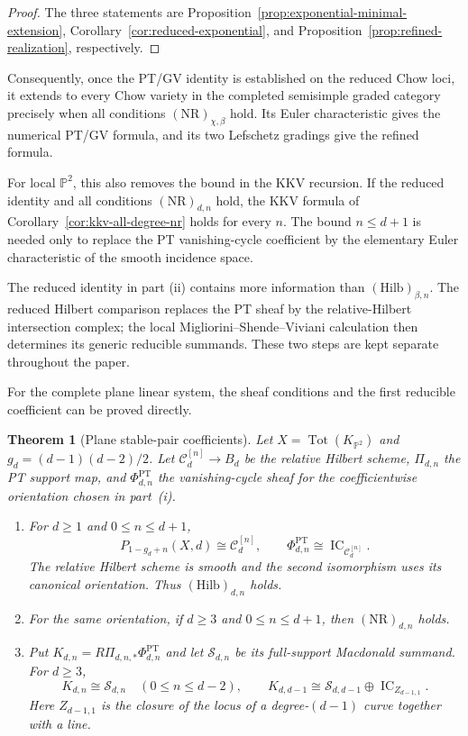 \documentclass[11pt,reqno]{amsart}
\newtheorem{theorem}{Theorem}[section]
\theoremstyle{definition}
\newcommand{\Pp}{\mathbb P}
\newcommand{\IC}{\operatorname{IC}}
\newcommand{\Tot}{\operatorname{Tot}}
\newcommand{\PT}{\operatorname{PT}}
\begin{document}
\begin{proof}
The three statements are Proposition~\ref{prop:exponential-minimal-extension},
Corollary~\ref{cor:reduced-exponential}, and
Proposition~\ref{prop:refined-realization}, respectively.
\end{proof}

Consequently, once the PT/GV identity is established on the reduced Chow
loci, it extends to every Chow variety in the completed semisimple graded
category precisely when all conditions $(\mathrm{NR})_{\chi,\beta}$ hold.
Its Euler characteristic gives the numerical PT/GV formula, and its two
Lefschetz gradings give the refined formula.

For local $\Pp^2$, this also removes the bound in the KKV recursion.  If the
reduced identity and all conditions $(\mathrm{NR})_{d,n}$ hold, the KKV
formula of Corollary~\ref{cor:kkv-all-degree-nr} holds for every $n$.  The
bound $n\le d+1$ is needed only to replace the PT vanishing-cycle coefficient
by the elementary Euler characteristic of the smooth incidence space.

The reduced identity in part \textnormal{(ii)} contains more information
than $(\mathrm{Hilb})_{\beta,n}$.  The reduced Hilbert comparison replaces
the PT sheaf by
the relative-Hilbert intersection complex; the local
Migliorini--Shende--Viviani calculation then determines its generic
reducible summands.  These two steps are kept separate throughout the
paper.

For the complete plane linear system, the sheaf conditions and the first
reducible coefficient can be proved directly.

\begin{theorem}[Plane stable-pair coefficients]
\label{thm:intro-plane}
Let $X=\Tot(K_{\Pp^2})$ and $g_d=(d-1)(d-2)/2$.  Let
$\mathcal C_d^{[n]}\to B_d$ be the relative Hilbert scheme,
$\Pi_{d,n}$ the PT support map, and $\Phi_{d,n}^{\PT}$ the vanishing-cycle
sheaf for the coefficientwise orientation chosen in part~\textnormal{(i)}.

\begin{enumerate}[label=\textnormal{(\roman*)},leftmargin=9mm]
\item For $d\ge1$ and $0\le n\le d+1$,
\[
 P_{1-g_d+n}(X,d)\cong\mathcal C_d^{[n]},
 \qquad
 \Phi_{d,n}^{\PT}\cong\IC_{\mathcal C_d^{[n]}}.
\]
The relative Hilbert scheme is smooth and the second isomorphism uses its
canonical orientation.  Thus $(\mathrm{Hilb})_{d,n}$ holds.

\item For the same orientation, if $d\ge3$ and $0\le n\le d+1$, then
$(\mathrm{NR})_{d,n}$ holds.

\item Put $K_{d,n}=R\Pi_{d,n,*}\Phi_{d,n}^{\PT}$ and let
$\mathcal S_{d,n}$ be its full-support Macdonald summand.  For $d\ge3$,
\[
 K_{d,n}\cong\mathcal S_{d,n}\quad(0\le n\le d-2),
 \qquad
 K_{d,d-1}\cong
 \mathcal S_{d,d-1}\oplus\IC_{Z_{d-1,1}}.
\]
Here $Z_{d-1,1}$ is the closure of the locus of a degree-$(d-1)$ curve
together with a line.
\end{enumerate}
\end{theorem}
\end{document}
